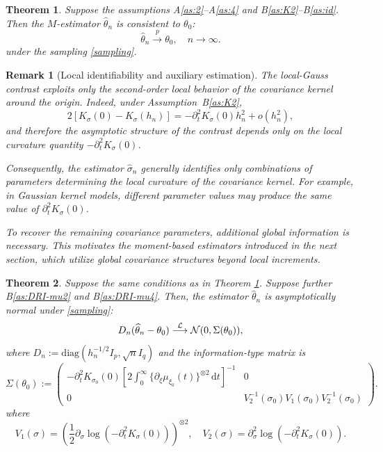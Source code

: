 \documentclass[a4paper,10pt,twoside]{article}
\newtheorem{thm}{Theorem}[section]
\newtheorem{remark}{Remark}[section]
\numberwithin{equation}{section}
\def\dis{\displaystyle}
\def\l{\left}
\def\r{\right}
\def\th{\theta}
\def\s{\sigma}
\def\p{\partial}
\def\toP{\stackrel{p}{\longrightarrow}}
\def\toD{\stackrel{{\cal L}}{\longrightarrow}}
\def\wh#1{\widehat{#1}}
\def\df{\mathrm{d}}
\begin{document}
\begin{thm}\label{thm:consist}
Suppose the assumptions A\ref{as:2}--A\ref{as:4} and B\ref{as:K2}--B\ref{as:id}. 
Then the $M$-estimator $\wh{\th}_n$ 
is consistent to $\th_0$: 
\[
\wh{\th}_n \toP \th_0,\quad n\to \infty.  
\]
under the sampling \eqref{sampling}. 
\end{thm}


\begin{remark}[Local identifiability and auxiliary estimation]
The local-Gauss contrast exploits only the second-order local behavior of the covariance kernel around the origin.
Indeed, under Assumption~B\ref{as:K2},
\[
2[K_\sigma(0)-K_\sigma(h_n)]
=
-\partial_t^2 K_\sigma(0) h_n^2 + o(h_n^2),
\]
and therefore the asymptotic structure of the contrast depends only on the local curvature quantity $-\partial_t^2 K_\sigma(0)$.

Consequently, the estimator $\widehat{\sigma}_n$ generally identifies only combinations of parameters determining
the local curvature of the covariance kernel. 
For example, in Gaussian kernel models, different parameter values may produce the same value of
$\partial_t^2 K_\sigma(0)$.

To recover the remaining covariance parameters, additional global information is necessary.
This motivates the moment-based estimators introduced in the next section, which utilize global covariance structures beyond local increments.
\end{remark}



\begin{thm}\label{thm:asy-norm}
Suppose the same conditions as in Theorem \ref{thm:consist}. Suppose further B\ref{as:DRI-mu2} and B\ref{as:DRI-mu4}. 
Then, the estimator $\wh{\theta}_n$ is asymptotically normal under \eqref{sampling}:
\[
D_n(\wh{\theta}_n - \theta_0) \toD \mathcal{N}(0, \Sigma(\theta_0)),
\]
where $D_n := \mathrm{diag}\l(h_n^{-1/2} I_p, \sqrt{n} I_q\r)$ and the information-type matrix is
\[
\Sigma(\theta_0) := 
\begin{pmatrix}
\dis -\p_t^2 K_{\s_0}(0) \l[2 \int_0^\infty \{\p_\xi \mu_{\xi_0}(t)\}^{\otimes 2}\, \df t\r]^{-1} & 0 \\
0 & V_2^{-1}(\s_0) V_1(\s_0) V_2^{-1}(\s_0)
\end{pmatrix}.
\]
where 
\[
V_1(\s) = \l(\frac{1}{2}\p_\s \log \l(-\p_t^2 K_{\s}(0)\r)\r)^{\otimes 2},\quad V_2(\s) =  \p_\s^2 \log \l(-\p_t^2 K_{\s}(0)\r). 
\]
\end{thm}
\end{document}
